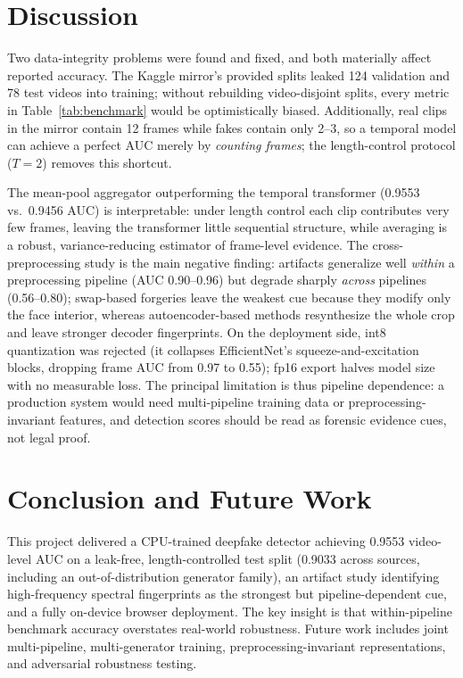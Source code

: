 \documentclass[conference]{IEEEtran}
\begin{document}
\section{Discussion}
Two data-integrity problems were found and fixed, and both materially affect reported accuracy. The Kaggle mirror's provided splits leaked 124 validation and 78 test videos into training; without rebuilding video-disjoint splits, every metric in Table~\ref{tab:benchmark} would be optimistically biased. Additionally, real clips in the mirror contain 12 frames while fakes contain only 2--3, so a temporal model can achieve a perfect AUC merely by \emph{counting frames}; the length-control protocol ($T=2$) removes this shortcut.

The mean-pool aggregator outperforming the temporal transformer (0.9553 vs.\ 0.9456 AUC) is interpretable: under length control each clip contributes very few frames, leaving the transformer little sequential structure, while averaging is a robust, variance-reducing estimator of frame-level evidence. The cross-preprocessing study is the main negative finding: artifacts generalize well \emph{within} a preprocessing pipeline (AUC 0.90--0.96) but degrade sharply \emph{across} pipelines (0.56--0.80); swap-based forgeries leave the weakest cue because they modify only the face interior, whereas autoencoder-based methods resynthesize the whole crop and leave stronger decoder fingerprints. On the deployment side, int8 quantization was rejected (it collapses EfficientNet's squeeze-and-excitation blocks, dropping frame AUC from 0.97 to 0.55); fp16 export halves model size with no measurable loss. The principal limitation is thus pipeline dependence: a production system would need multi-pipeline training data or preprocessing-invariant features, and detection scores should be read as forensic evidence cues, not legal proof.

\section{Conclusion and Future Work}
This project delivered a CPU-trained deepfake detector achieving 0.9553 video-level AUC on a leak-free, length-controlled test split (0.9033 across sources, including an out-of-distribution generator family), an artifact study identifying high-frequency spectral fingerprints as the strongest but pipeline-dependent cue, and a fully on-device browser deployment. The key insight is that within-pipeline benchmark accuracy overstates real-world robustness. Future work includes joint multi-pipeline, multi-generator training, preprocessing-invariant representations, and adversarial robustness testing.
\end{document}

